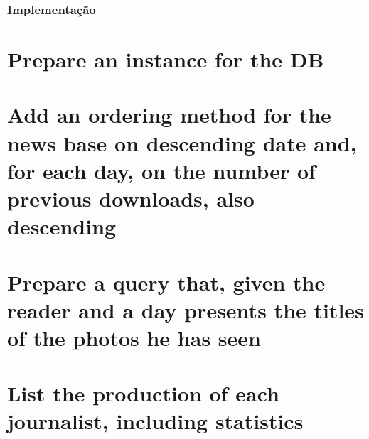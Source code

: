 \documentclass[a4paper,11pt]{article}
\begin{document}
\subsubsection{Implementação}


\section{Prepare an instance for the DB}


\section{Add an ordering method for the news base on descending date and, for each day, on the number of previous downloads, also descending}


\section{Prepare a query that, given the reader and a day presents the titles of the photos he has seen}

\begin{center}\noindent{}\end{center}

\section{List the production of each journalist, including statistics}



\begin{center}\noindent{}\end{center}


\begin{center}\noindent{}\end{center}


\begin{center}\noindent{}\end{center}


\begin{center}\noindent{}\end{center}


\begin{center}\noindent{}\end{center}
\end{document}
